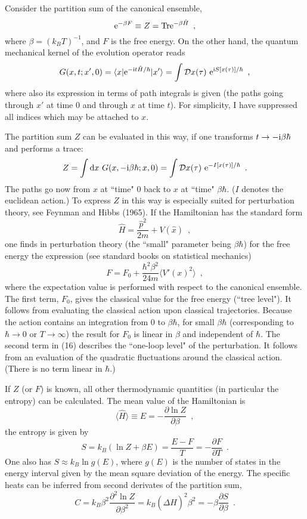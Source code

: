 \documentclass[12pt]{article}
\def\D{{\rm d}}
\def\E{{\rm e}}
\def\I{{\rm i}}
\newcommand{\be}{\begin{equation}}
\newcommand{\ee}{\end{equation}}
\begin{document}
Consider the partition sum of the canonical ensemble,
\be \E^{-\beta F}\equiv Z=\mbox{Tr}\E^{-\beta\hat{H}} \enspace , \ee
where $\beta=(k_BT)^{-1}$, and $F$ is the free energy.
On the other hand, the quantum mechanical kernel of the evolution
operator reads
\be G(x,t;x',0)=\langle x\vert\E^{-\I t\hat{H}/\hbar}\vert x'
    \rangle =\int{\cal D}x(\tau)\ \E^{\I S[x(\tau)]/\hbar}
    \enspace , \ee
where also its expression in terms of path integrals is given
(the paths going through $x'$ at time $0$ and through $x$ at
time $t$). For simplicity, I have suppressed all indices which may
be attached to $x$.

The partition sum $Z$ can be evaluated in this way, if one
transforms $t\to -\I\beta\hbar$ and performs a trace:
\be Z=\int \D x\ G(x,-\I\beta\hbar;x,0)
     = \int{\cal D}x(\tau)\ \E^{-I[x(\tau)]/\hbar} \enspace . \ee
The paths go now from $x$ at ``time" $0$ back to $x$ at ``time"
$\beta\hbar$. ($I$ denotes the euclidean action.)
 To express $Z$ in this way is especially suited
for perturbation theory, see Feynman and Hibbs (1965).
If the Hamiltonian has the standard form
\be \hat{H}=\frac{\hat{p}^2}{2m}+ V(\hat{x}) \enspace , \ee
one finds in perturbation theory (the ``small" parameter
being $\beta\hbar$)
 for the free energy
the expression (see standard books on statistical mechanics)
\be F=F_0 + \frac{\hbar^2\beta^2}{24m}\langle V'(x)^2\rangle
    \enspace , \ee
where the expectation value is performed with respect to the
canonical ensemble. The first term, $F_0$, gives the classical
value for the free energy (``tree level"). It follows from
evaluating the classical action upon classical trajectories.
Because the action contains an integration from $0$ to $\beta\hbar$,
for small $\beta\hbar$ (corresponding to $\hbar\to0$
or $T\to\infty$) the result for $F_0$ is linear in $\beta$
and independent of $\hbar$. The second term in (16) 
describes the ``one-loop level" of the perturbation. It follows from
an evaluation of the quadratic fluctuations around the classical
action. (There is no term linear in $\hbar$.)

If $Z$ (or $F$) is known, all other thermodynamic quantities
(in particular the entropy) can be calculated. The mean value
of the Hamiltonian is
\be \langle\hat{H}\rangle \equiv E=-\frac{\partial\ln Z}{\partial\beta}
     \enspace , \ee
the entropy is given by
\be S=k_B(\ln Z+\beta E)=\frac{E-F}{T}= -\frac{\partial F}
     {\partial T} \enspace . \ee
One also has $S\approx k_B\ln g(E)$, where $g(E)$ is the number
of states in the energy interval given by the mean square deviation
of the energy. The specific heats can be inferred from
second derivates of the partition sum,
\be  C= k_B\beta^2\frac{\partial^2\ln Z}{\partial\beta^2}
    =k_B(\Delta\hat{H})^2\beta^2=-\beta\frac{\partial S}{\partial\beta}
    \enspace . \ee
\end{document}
